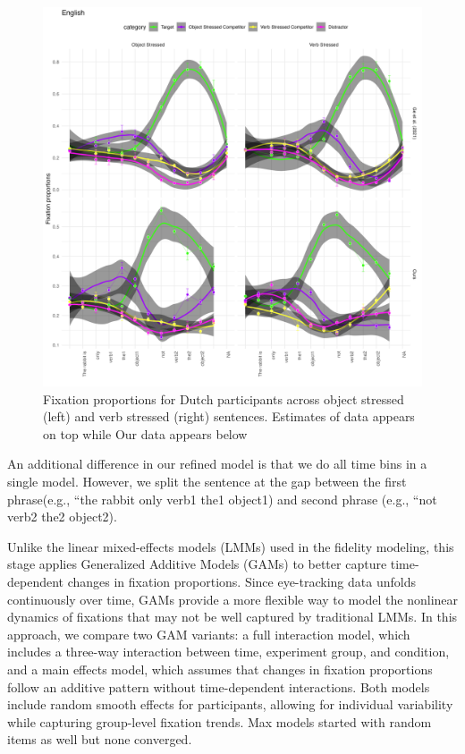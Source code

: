 \begin{figure}[H]  %
    \centering
    \includegraphics[width=\textwidth,height=\textheight,keepaspectratio]{viz/dutch_fix2.png}
    \caption{Fixation proportions for Dutch participants across object stressed (left) and verb stressed (right) sentences. Estimates of \cite{Ge2021} data appears on top while Our data appears below}
    \label{fig:dutch_fix2}
\end{figure}

An additional difference in our refined model is that we do all time bins in a single model. However, we split the sentence at the gap between the first phrase(e.g., ``the rabbit only verb1 the1 object1) and second phrase (e.g., ``not verb2 the2 object2). 

Unlike the linear mixed-effects models (LMMs) used in the fidelity modeling, this stage applies Generalized Additive Models (GAMs) to better capture time-dependent changes in fixation proportions. Since eye-tracking data unfolds continuously over time, GAMs provide a more flexible way to model the nonlinear dynamics of fixations that may not be well captured by traditional LMMs. In this approach, we compare two GAM variants: a full interaction model, which includes a three-way interaction between time, experiment group, and condition, and a main effects model, which assumes that changes in fixation proportions follow an additive pattern without time-dependent interactions. Both models include random smooth effects for participants, allowing for individual variability while capturing group-level fixation trends. Max models started with random items as well but none converged.

